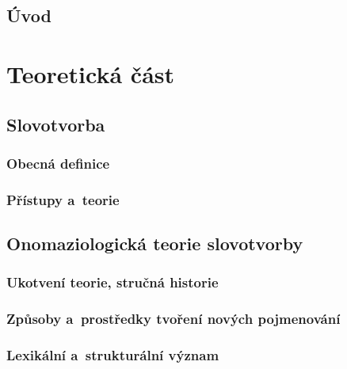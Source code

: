 \hypertarget{uxfavod}{%
\chapter*{Úvod}\label{uvod}
}

\part{Teoretická část}

\hypertarget{slovotvorba}{%
\chapter{Slovotvorba}\label{slovotvorba}}

\hypertarget{obecnuxe1-definice}{%
\section{Obecná definice}\label{obecnuxe1-definice}}

\hypertarget{pux159uxedstupy-a-teorie}{%
\section{Přístupy a~teorie}\label{pux159uxedstupy-a-teorie}}

\hypertarget{onomaziologickuxe1-teorie-slovotvorby}{%
\chapter{Onomaziologická teorie
slovotvorby}\label{onomaziologickuxe1-teorie-slovotvorby}}

\hypertarget{ukotvenuxed-teorie-struux10dnuxe1-historie}{%
\section{Ukotvení teorie, stručná
historie}\label{ukotvenuxed-teorie-struux10dnuxe1-historie}}

\hypertarget{zpux16fsoby-a-prostux159edky-tvoux159enuxed-novuxfdch-pojmenovuxe1nuxed}{%
\section{Způsoby a~prostředky tvoření nových
pojmenování}\label{zpux16fsoby-a-prostux159edky-tvoux159enuxed-novuxfdch-pojmenovuxe1nuxed}}

\hypertarget{lexikuxe1lnuxed-a-strukturuxe1lnuxed-vuxfdznam}{%
\section{Lexikální a~strukturální
význam}\label{lexikuxe1lnuxed-a-strukturuxe1lnuxed-vuxfdznam}}

